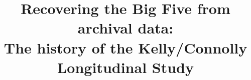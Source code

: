 \documentclass[a4paper,man,natbib,12pt,apacite]{apa6}\usepackage[]{graphicx}\usepackage[]{color}
\title{Recovering the Big Five from archival data:\\ The history of the Kelly/Connolly Longitudinal Study}
\begin{document}
\maketitle
\nocite{*}

\end{document}
